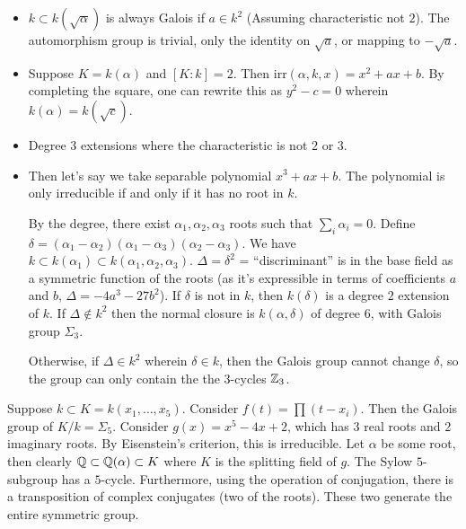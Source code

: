 \begin{example}
    \begin{itemize}
        \item $k \subset k(\sqrt{\alpha})$ is always Galois if $a \in k^2$ (Assuming characteristic not $2$).
        The automorphism group is trivial, only the identity on $\sqrt{a}$, or mapping to $-\sqrt{a}$.
        \item Suppose $K = k(\alpha)$ and $[K: k] = 2$. Then $\text{irr}(\alpha, k, x) = x^2 + ax + b$.
        By completing the square, one can rewrite this as $y^2 - c = 0$ wherein $k(\alpha) = k(\sqrt{c})$.
        \item Degree 3 extensions where the characteristic is not $2$ or $3$.
        \item Then let's say we take separable polynomial $x^3 + ax + b$.
        The polynomial is only irreducible if and only if it has no root in $k$.        


        By the degree, there exist $\alpha_1, \alpha_2, \alpha_3$ roots
        such that $\sum_i \alpha_i = 0$. 
        Define $\delta = (\alpha_1 - \alpha_2)(\alpha_1 - \alpha_3)(\alpha_2 - \alpha_3)$.
        We have $k \subset k(\alpha_1) \subset k(\alpha_1, \alpha_2, \alpha_3)$.
        $\Delta = \delta^2$ = ``discriminant'' is in the base field
        as a symmetric function of the roots (as it's expressible in terms of coefficients $a$ and $b$, $\Delta = - 4a^3 - 27b^2$).
        If $\delta$ is not in $k$, then $k(\delta)$ is a degree $2$ extension of $k$.
        If $\Delta \notin k^2$ then the normal closure is $k(\alpha, \delta)$ of degree $6$,
        with Galois group $\Sigma_3$. 
        
        Otherwise, if $\Delta \in k^2$ wherein $\delta \in k$, then the Galois group
        cannot change $\delta$, so the group can only contain the the 3-cycles $\operatorname{\mathbb{Z}}_3$.
    \end{itemize}
\end{example}

Suppose $k \subset K = k(x_1, \dots, x_5)$. Consider $f(t) = \prod (t-x_i)$.
Then the Galois group of $K/k = \Sigma_5$. Consider $g(x)= x^5 -4x + 2$,
which has $3$ real roots and 2 imaginary roots. By Eisenstein's criterion, this
is irreducible. Let $\alpha$ be some root,
then clearly $\operatorname{\mathbb{Q}} \subset \operatorname{\mathbb{Q}}(\alpha) \subset K$ where $K$ is the splitting field of $g$.
The Sylow $5$-subgroup has a $5$-cycle.
Furthermore, using the operation of conjugation, there is a transposition of complex
conjugates (two of the roots). These two generate the entire symmetric group.